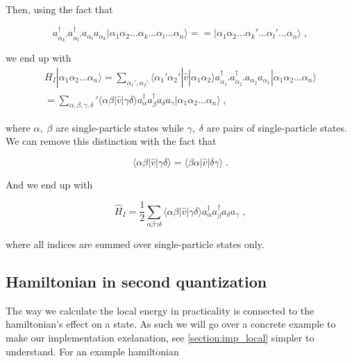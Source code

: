 Then, using the fact that

\begin{equation}
    a_{\alpha_k'}^{\dagger} a_{\alpha_l'}^{\dagger} a_{\alpha_l} a_{\alpha_k} 
    	|\alpha_1\alpha_2\dots\alpha_k\dots\alpha_l\dots\alpha_n\rangle  = 
    = |\alpha_1\alpha_2\dots\alpha_k'\dots\alpha_l'\dots\alpha_n\rangle \; ,\label{eq:2-35}
\end{equation}

we end up with
\begin{equation}
\begin{gathered}
    H_I |\alpha_1\alpha_2\dots\alpha_n\rangle
    = \sum_{\alpha_1', \alpha_2'} \langle \alpha_1'\alpha_2'|\hat{v}|\alpha_1\alpha_2\rangle
    	a_{\alpha_1'}^{\dagger} a_{\alpha_2'}^{\dagger} a_{\alpha_2} a_{\alpha_1}
    	|\alpha_1\alpha_2\dots\alpha_n\rangle  \\
    = \sum_{\alpha, \beta, \gamma, \delta} ' \langle \alpha\beta|\hat{v}|\gamma\delta\rangle
    	a^{\dagger}_\alpha a^{\dagger}_\beta a_\delta a_\gamma
    	|\alpha_1\alpha_2\dots\alpha_n\rangle \label{eq:2-36} \; ,
\end{gathered}
\end{equation}

where $\alpha, \; \beta$ are single-particle states while $\gamma, \; \delta$ are pairs of single-particle states. We can remove this distinction with the fact that

\begin{equation}
    \langle \alpha\beta|\hat{v}|\gamma\delta\rangle = \langle \beta\alpha|\hat{v}|\delta\gamma\rangle \label{eq:2-37} \; .
\end{equation}

And we end up with

\begin{equation}
    \hat{H}_I = \frac{1}{2} \sum_{\alpha\beta\gamma\delta} \langle \alpha\beta|\hat{v}|\gamma\delta\rangle
    	a^{\dagger}_\alpha a^{\dagger}_\beta a_\delta a_\gamma \label{eq:2-39} \; ,
\end{equation}

where all indices are summed over single-particle states only.

\subsection{Hamiltonian in second quantization}

The way we calculate the local energy in practicality is connected to the hamiltonian's effect on a state. As such we will go over a concrete example to make our implementation exelanation, see \ref{section:imp_local} simpler to understand. For an example hamiltonian

